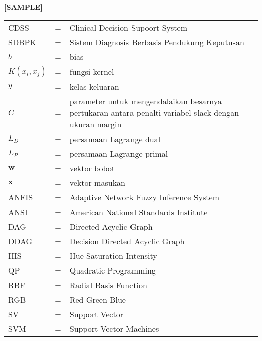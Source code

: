 \begin{center}
	\textbf{[SAMPLE]}
\end{center}

\begin{tabular}{llp{3in}}
	CDSS &  \hspace{1.5cm} = &	Clinical Decision Supoort System\\
	SDBPK &  \hspace{1.5cm} = &	Sistem Diagnosis Berbasis Pendukung Keputusan\\
	$b$	& \hspace{1.5cm} = &	bias \\
	$K(x_i,x_j)$ & \hspace{1.5cm} = & fungsi kernel \\ 
	$y$	& \hspace{1.5cm} = & kelas keluaran \\
	$C$	&  \hspace{1.5cm} = & parameter untuk mengendalaikan besarnya pertukaran antara penalti variabel slack dengan ukuran margin \\
	$L_D$	& \hspace{1.5cm} = & persamaan Lagrange dual \\
	$L_P$	& \hspace{1.5cm}  = &	persamaan Lagrange primal \\
	$\textbf{w}$ &  \hspace{1.5cm} = &	vektor bobot \\
	$\textbf{x}$ &  \hspace{1.5cm} = &	vektor masukan\\
		ANFIS &  \hspace{1.5cm} = &	Adaptive Network Fuzzy Inference System\\
		ANSI	&  \hspace{1.5cm} = &	American National Standards Institute\\
		DAG	&  \hspace{1.5cm} = & Directed Acyclic Graph\\
		DDAG &  \hspace{1.5cm} = & Decision Directed Acyclic Graph\\
		HIS	&  \hspace{1.5cm} = & Hue Saturation Intensity\\
		QP	&  \hspace{1.5cm} = & Quadratic Programming\\
		RBF	&  \hspace{1.5cm} = &	Radial Basis Function\\
		RGB	&  \hspace{1.5cm} = & Red Green Blue\\
		SV	&  \hspace{1.5cm} = &	Support Vector\\
		SVM	&  \hspace{1.5cm} = & Support Vector Machines\\
		
\end{tabular}

